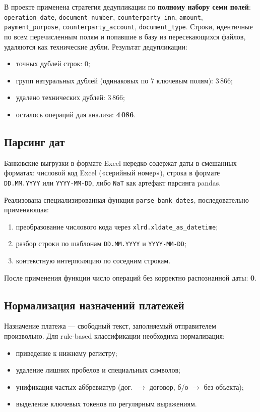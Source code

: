 В проекте применена стратегия дедупликации по \textbf{полному набору семи полей}: \texttt{operation\_date}, \texttt{document\_number}, \texttt{counterparty\_inn}, \texttt{amount}, \texttt{payment\_purpose}, \texttt{counterparty\_account}, \texttt{document\_type}. Строки, идентичные по всем перечисленным полям и попавшие в базу из пересекающихся файлов, удаляются как технические дубли. Результат дедупликации:
\begin{itemize}
  \item точных дублей строк: 0;
  \item групп натуральных дублей (одинаковых по 7 ключевым полям): 3\,866;
  \item удалено технических дублей: 3\,866;
  \item осталось операций для анализа: \textbf{4\,086}.
\end{itemize}

\subsection{Парсинг дат}

Банковские выгрузки в формате Excel нередко содержат даты в смешанных форматах: числовой код Excel («серийный номер»), строка в формате \texttt{DD.MM.YYYY} или \texttt{YYYY-MM-DD}, либо \texttt{NaT} как артефакт парсинга pandas.

Реализована специализированная функция \texttt{parse\_bank\_dates}, последовательно применяющая:
\begin{enumerate}
  \item преобразование числового кода через \texttt{xlrd.xldate\_as\_datetime};
  \item разбор строки по шаблонам \texttt{DD.MM.YYYY} и \texttt{YYYY-MM-DD};
  \item контекстную интерполяцию по соседним строкам.
\end{enumerate}

После применения функции число операций без корректно распознанной даты: \textbf{0}.

\subsection{Нормализация назначений платежей}

Назначение платежа --- свободный текст, заполняемый отправителем произвольно. Для rule-based классификации необходима нормализация:
\begin{itemize}
  \item приведение к нижнему регистру;
  \item удаление лишних пробелов и специальных символов;
  \item унификация частых аббревиатур (дог.\ $\to$ договор, б/о $\to$ без объекта);
  \item выделение ключевых токенов по регулярным выражениям.
\end{itemize}

